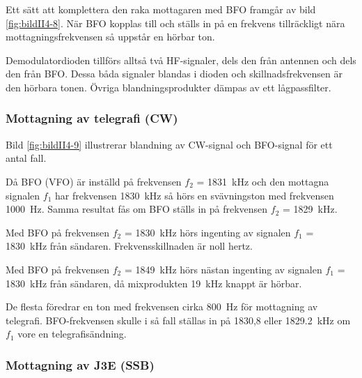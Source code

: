 Ett sätt att komplettera den raka mottagaren med BFO framgår av bild
\ref{fig:bildII4-8}.
När BFO kopplas till och ställs in på en frekvens tillräckligt
nära mottagningsfrekvensen så uppstår en hörbar ton.

Demodulatordioden tillförs alltså två HF-signaler, dels den från
antennen och dels den från BFO.
Dessa båda signaler blandas i dioden och skillnadsfrekvensen är den hörbara
tonen.
Övriga blandningsprodukter dämpas av ett lågpassfilter.



\subsubsection{Mottagning av telegrafi (CW)}

Bild \ref{fig:bildII4-9} illustrerar blandning av CW-signal och BFO-signal
för ett antal fall.

Då BFO (VFO) är inställd på frekvensen \(f_2\) = \SI{1831}{\kilo\hertz} och den
mottagna signalen \(f_1\) har frekvensen \SI{1830}{\kilo\hertz} så hörs en
svävningston med frekvensen \SI{1000}{\hertz}.
Samma resultat fås om BFO ställs in på frekvensen \(f_2\) =
\SI{1829}{\kilo\hertz}.

Med BFO på frekvensen \(f_2\) = \SI{1830}{\kilo\hertz} hörs ingenting av
signalen \(f_1\) = \SI{1830}{\kilo\hertz} från sändaren.
Frekvensskillnaden är noll hertz.

Med BFO på frekvensen \(f_2\) = \SI{1849}{\kilo\hertz} hörs nästan ingenting av
signalen \(f_1\) = \SI{1830}{\kilo\hertz} från sändaren, då mixprodukten
\SI{19}{\kilo\hertz} knappt är hörbar.

De flesta föredrar en ton med frekvensen cirka \SI{800}{\hertz} för mottagning
av telegrafi.
BFO-frekvensen skulle i så fall ställas in på 1830,8 eller
\SI{1829,2}{\kilo\hertz} om \(f_1\) vore en telegrafisändning.


\subsubsection{Mottagning av J3E (SSB)}

